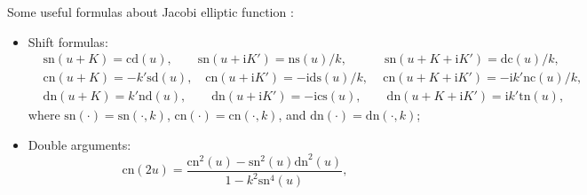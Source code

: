 \documentclass[11pt,reqno]{amsart}
\newcommand{\ii}{\mathrm{i}}
\newcommand{\sn}{\mathrm{sn}}
\newcommand{\cn}{\mathrm{cn}}
\newcommand{\dn}{\mathrm{dn}}
\newcommand{\nc}{\mathrm{nc}}
\newcommand{\tn}{\mathrm{tn}}
\newcommand{\dc}{\mathrm{dc}}
\newcommand{\cs}{\mathrm{cs}}
\newcommand{\ns}{\mathrm{ns}}
\newcommand{\ds}{\mathrm{ds}}
\newcommand{\cd}{\mathrm{cd}}
\newcommand{\sd}{\mathrm{sd}}
\newcommand{\nd}{\mathrm{nd}}
\numberwithin{equation}{section}
\begin{document}
Some useful formulas about Jacobi elliptic function \cite{ByrdF-54}:
\begin{itemize}
	\item Shift formulas:
	\begin{equation}\label{eq:Jacobi-shift}
		\begin{split}
			&\sn(u+K)=\cd(u),\qquad \sn(u+\ii K')=\ns(u)/k, \qquad \quad  \sn(u+K+\ii K')=\dc(u)/k, \\
			&\cn(u+K)=-k'\sd(u), \quad \cn(u+\ii K')=-\ii \ds(u)/k,  \, \quad 
			\cn(u+K+\ii K')=-\ii k'\nc(u)/k, \\ 
			&\dn(u+K)=k'\nd(u), \qquad \dn(u+\ii K')=-\ii \cs(u),\quad \quad 
			\dn(u+K+\ii K')=\ii k' \tn(u),
		\end{split}
	\end{equation}
	where $\sn(\cdot)=\sn(\cdot,k)$, $\cn(\cdot)=\cn(\cdot,k)$, and $\dn(\cdot)=\dn(\cdot,k)$;
	\item Double arguments:
	\begin{equation}\label{eq:Jacobi-double}
		\cn(2u)=\frac{\cn^2(u)-\sn^2(u)\dn^2(u)}{1-k^2\sn^4(u)}, \quad 

\end{equation}
\end{itemize}
\end{document}
